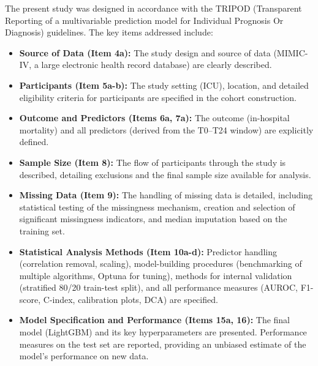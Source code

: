 \medskip
The present study was designed in accordance with the TRIPOD (Transparent Reporting of a multivariable prediction model for Individual Prognosis Or Diagnosis) guidelines. The key items addressed include:
\begin{itemize}
    \item \textbf{Source of Data (Item 4a):} The study design and source of data (MIMIC-IV, a large electronic health record database) are clearly described.
    \item \textbf{Participants (Item 5a-b):} The study setting (ICU), location, and detailed eligibility criteria for participants are specified in the cohort construction.
    \item \textbf{Outcome and Predictors (Items 6a, 7a):} The outcome (in-hospital mortality) and all predictors (derived from the T0--T24 window) are explicitly defined.
    \item \textbf{Sample Size (Item 8):} The flow of participants through the study is described, detailing exclusions and the final sample size available for analysis.
    \item \textbf{Missing Data (Item 9):} The handling of missing data is detailed, including statistical testing of the missingness mechanism, creation and selection of significant missingness indicators, and median imputation based on the training set.
    \item \textbf{Statistical Analysis Methods (Item 10a-d):} Predictor handling (correlation removal, scaling), model-building procedures (benchmarking of multiple algorithms, Optuna for tuning), methods for internal validation (stratified 80/20 train-test split), and all performance measures (AUROC, F1-score, C-index, calibration plots, DCA) are specified.
    \item \textbf{Model Specification and Performance (Items 15a, 16):} The final model (LightGBM) and its key hyperparameters are presented. Performance measures on the test set are reported, providing an unbiased estimate of the model's performance on new data.
\end{itemize}
